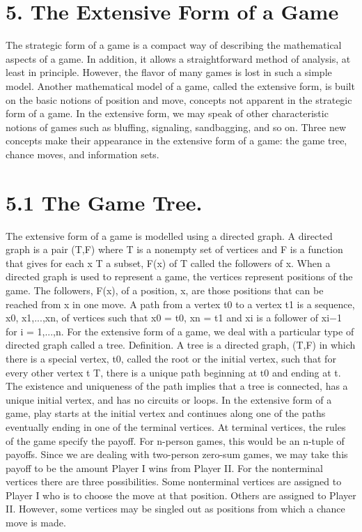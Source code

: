 \section{5. The Extensive Form of a Game}
The strategic form of a game is a compact way of describing the mathematical aspects
of a game. In addition, it allows a straightforward method of analysis, at least in principle.
However, the flavor of many games is lost in such a simple model. Another mathematical
model of a game, called the extensive form, is built on the basic notions of position and
move, concepts not apparent in the strategic form of a game. In the extensive form, we
may speak of other characteristic notions of games such as bluffing, signaling, sandbagging,
and so on. Three new concepts make their appearance in the extensive form of a game:
the game tree, chance moves, and information sets.
\section{5.1 The Game Tree.} The extensive form of a game is modelled using a directed
graph. A directed graph is a pair (T,F) where T is a nonempty set of vertices and F is
a function that gives for each x \in T a subset, F(x) of T called the followers of x. When
a directed graph is used to represent a game, the vertices represent positions of the game.
The followers, F(x), of a position, x, are those positions that can be reached from x in one
move.
A path from a vertex t0 to a vertex t1 is a sequence, x0, x1,...,xn, of vertices
such that x0 = t0, xn = t1 and xi is a follower of xi−1 for i = 1,...,n. For the extensive
form of a game, we deal with a particular type of directed graph called a tree.
Definition. A tree is a directed graph, (T,F) in which there is a special vertex, t0, called
the root or the initial vertex, such that for every other vertex t \in T, there is a unique path
beginning at t0 and ending at t.
The existence and uniqueness of the path implies that a tree is connected, has a unique
initial vertex, and has no circuits or loops.
In the extensive form of a game, play starts at the initial vertex and continues along
one of the paths eventually ending in one of the terminal vertices. At terminal vertices,
the rules of the game specify the payoff. For n-person games, this would be an n-tuple of
payoffs. Since we are dealing with two-person zero-sum games, we may take this payoff to
be the amount Player I wins from Player II. For the nonterminal vertices there are three
possibilities. Some nonterminal vertices are assigned to Player I who is to choose the move
at that position. Others are assigned to Player II. However, some vertices may be singled
out as positions from which a chance move is made.

